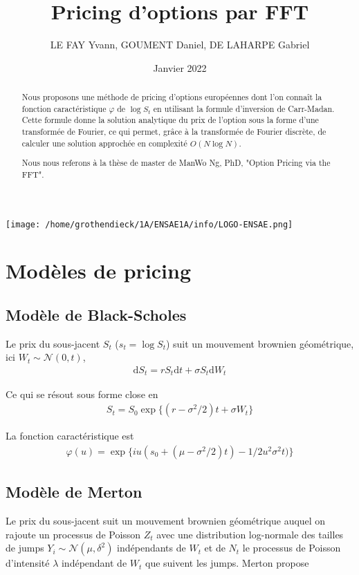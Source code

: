 \documentclass{article}
\begin{document}
\title{Pricing d'options par FFT}
\author{LE FAY Yvann, GOUMENT Daniel, DE LAHARPE Gabriel}
\date{Janvier 2022}
\maketitle
\begin{center}
	\texttt{[image: /home/grothendieck/1A/ENSAE1A/info/LOGO-ENSAE.png]}
\end{center}
\begin{abstract}
	Nous proposons une méthode de pricing d'options européennes dont l'on connaît la fonction caractéristique $\varphi$ de $\log S_t$ en utilisant la formule d'inversion de Carr-Madan. Cette formule donne la solution analytique du prix de l'option sous la forme d'une transformée de Fourier, ce qui permet, grâce à la transformée de Fourier discrète, de calculer une solution approchée en complexité $O(N\log N)$. 

	Nous nous referons à la thèse de master de ManWo Ng, PhD, "Option Pricing via the FFT".
\end{abstract}

\section{Modèles de pricing}
\subsection{Modèle de Black-Scholes}

Le prix du sous-jacent $S_t$ ($s_t = \log S_t$) suit un mouvement brownien géométrique, ici $W_t\sim \mathcal{N}(0, t)$, 
\begin{align*}
	\mathrm{d}S_t = rS_t\mathrm{d}t + \sigma S_t \mathrm{d}W_t
\end{align*}

Ce qui se résout sous forme close en
\begin{align*}
	S_t = S_0\exp\big\{(r-\sigma^2/2)t+\sigma W_t\big\}
\end{align*}

La fonction caractéristique est 
\begin{align*}
	\varphi(u) = \exp\big\{iu(s_0+(\mu-\sigma^2/2)t)-1/2u^2\sigma^2t)\big\}
\end{align*}
\subsection{Modèle de Merton}
Le prix du sous-jacent suit un mouvement brownien géométrique auquel on rajoute un processus de Poisson $Z_t$ avec une distribution log-normale des tailles de jumps $Y_i\sim \mathcal{N}(\mu, \delta^2)$ indépendants de $W_t$ et de $N_t$ le processus de Poisson d'intensité $\lambda$ indépendant de $W_t$ que suivent les jumps. Merton propose
\end{document}
